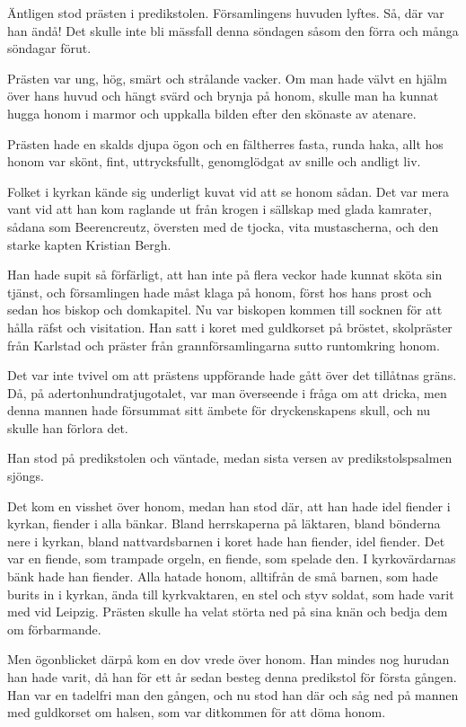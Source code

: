 
\noindent Äntligen stod prästen i predikstolen. Församlingens huvuden lyftes. Så, där var han ändå! Det skulle inte bli mässfall denna söndagen såsom den förra och många söndagar förut.

Prästen var ung, hög, smärt och strålande vacker. Om man hade välvt en hjälm över hans huvud och hängt svärd och brynja på honom, skulle man ha kunnat hugga honom i marmor och uppkalla bilden efter den skönaste av atenare.

Prästen hade en skalds djupa ögon och en fältherres fasta, runda haka, allt hos honom var skönt, fint, uttrycksfullt, genomglödgat av snille och andligt liv.

Folket i kyrkan kände sig underligt kuvat vid att se honom sådan. Det var mera vant vid att han kom raglande ut från krogen i sällskap med glada kamrater, sådana som Beerencreutz, översten med de tjocka, vita mustascherna, och den starke kapten Kristian Bergh.

Han hade supit så förfärligt, att han inte på flera veckor hade kunnat sköta sin tjänst, och församlingen hade måst klaga på honom, först hos hans prost och sedan hos biskop och domkapitel. Nu var biskopen kommen till socknen för att hålla räfst och visitation. Han satt i koret med guldkorset på bröstet, skolpräster från Karlstad och präster från grannförsamlingarna sutto runtomkring honom.

Det var inte tvivel om att prästens uppförande hade gått över det tillåtnas gräns. Då, på adertonhundratjugotalet, var man överseende i fråga om att dricka, men denna mannen hade försummat sitt ämbete för dryckenskapens skull, och nu skulle han förlora det.

Han stod på predikstolen och väntade, medan sista versen av predikstolspsalmen sjöngs.

Det kom en visshet över honom, medan han stod där, att han hade idel fiender i kyrkan, fiender i alla bänkar. Bland herrskaperna på läktaren, bland bönderna nere i kyrkan, bland nattvardsbarnen i koret hade han fiender, idel fiender. Det var en fiende, som trampade orgeln, en fiende, som spelade den. I kyrkovärdarnas bänk hade han fiender. Alla hatade honom, alltifrån de små barnen, som hade burits in i kyrkan, ända till kyrkvaktaren, en stel och styv soldat, som hade varit med vid Leipzig.
Prästen skulle ha velat störta ned på sina knän och bedja dem om förbarmande.

Men ögonblicket därpå kom en dov vrede över honom. Han mindes nog hurudan han hade varit, då han för ett år sedan besteg denna predikstol för första gången. Han var en tadelfri man den gången, och nu stod han där och såg ned på mannen med guldkorset om halsen, som var ditkommen för att döma honom.

